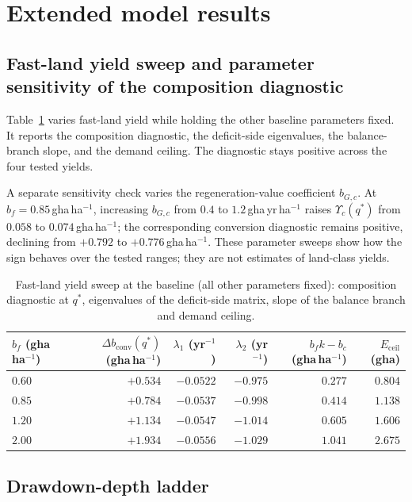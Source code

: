 \documentclass[11pt,a4paper]{article}
\newcommand{\dconv}{\Delta b_{\mathrm{conv}}}
\newcommand{\Ups}{\Upsilon_c}
\newcommand{\Eceil}{E_{\mathrm{ceil}}}
\begin{document}
\section{Extended model results}\label{si:results}

\subsection{Fast-land yield sweep and parameter sensitivity of the composition diagnostic}\label{si:sweep}

Table~\ref{tab:si_sweep} varies fast-land yield while holding the other baseline parameters fixed. It reports the composition diagnostic, the deficit-side eigenvalues, the balance-branch slope, and the demand ceiling. The diagnostic stays positive across the four tested yields.

A separate sensitivity check varies the regeneration-value coefficient $b_{G,c}$. At $b_f=0.85$\,gha\,ha$^{-1}$, increasing $b_{G,c}$ from $0.4$ to $1.2$\,gha\,yr\,ha$^{-1}$ raises $\Ups(q^*)$ from $0.058$ to $0.074$\,gha\,ha$^{-1}$; the corresponding conversion diagnostic remains positive, declining from $+0.792$ to $+0.776$\,gha\,ha$^{-1}$. These parameter sweeps show how the sign behaves over the tested ranges; they are not estimates of land-class yields.

\begin{table}[htbp]
\centering\small
\caption{Fast-land yield sweep at the baseline (all other parameters fixed): composition diagnostic at $q^*$, eigenvalues of the deficit-side matrix, slope of the balance branch and demand ceiling.}
\label{tab:si_sweep}
\begin{tabular}{l r r r r r}
\toprule
$b_f$ (gha\,ha$^{-1}$) & $\dconv(q^*)$ (gha\,ha$^{-1}$) & $\lambda_1$ (yr$^{-1}$) & $\lambda_2$ (yr$^{-1}$) & $b_fk-b_c$ (gha\,ha$^{-1}$) & $\Eceil$ (gha) \\
\midrule
$0.60$ & $+0.534$ & $-0.0522$ & $-0.975$ & $0.277$ & $0.804$ \\
$0.85$ & $+0.784$ & $-0.0537$ & $-0.998$ & $0.414$ & $1.138$ \\
$1.20$ & $+1.134$ & $-0.0547$ & $-1.014$ & $0.605$ & $1.606$ \\
$2.00$ & $+1.934$ & $-0.0556$ & $-1.029$ & $1.041$ & $2.675$ \\
\bottomrule
\end{tabular}
\end{table}

\subsection{Drawdown-depth ladder}\label{si:ladder}
\end{document}
